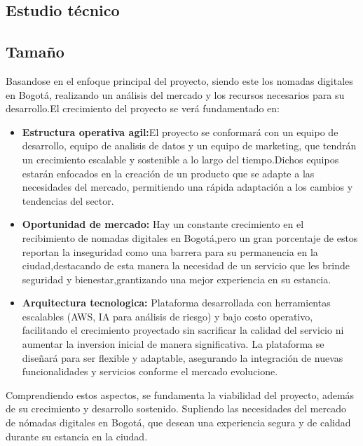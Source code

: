 \subsection{Estudio técnico}
\subsection{Tamaño}
Basandose en el enfoque principal del proyecto, siendo este los nomadas digitales en Bogotá, realizando un análisis del mercado y los recursos necesarios para su desarrollo.El crecimiento del proyecto se verá fundamentado en:

\begin{itemize}
    \item \textbf{Estructura operativa agil:}El proyecto se conformará con un equipo de desarrollo, equipo de analisis de datos y un equipo de marketing, que tendrán un crecimiento escalable y sostenible a lo largo del tiempo.Dichos equipos estarán enfocados en la creación de un producto que se adapte a las necesidades del mercado, permitiendo una rápida adaptación a los cambios y tendencias del sector.
    \item \textbf{Oportunidad de mercado:} Hay un constante crecimiento en el recibimiento de nomadas digitales en Bogotá,pero un gran porcentaje de estos reportan la inseguridad como una barrera para su permanencia en la ciudad,destacando de esta manera la necesidad de un servicio que les brinde seguridad y bienestar,grantizando una mejor experiencia en su estancia.
    \item \textbf{Arquitectura tecnologica:} Plataforma desarrollada con herramientas escalables (AWS, IA para análisis de riesgo) y bajo costo operativo, facilitando el crecimiento proyectado sin sacrificar la calidad del servicio ni aumentar la inversion inicial de manera significativa. La plataforma se diseñará para ser flexible y adaptable, asegurando la integración de nuevas funcionalidades y servicios conforme el mercado evolucione.
\end{itemize}

Comprendiendo estos aspectos, se fundamenta la viabilidad del proyecto, además de su crecimiento y desarrollo sostenido. Supliendo las necesidades del mercado de nómadas digitales en Bogotá, que desean una experiencia segura y de calidad durante su estancia en la ciudad.

